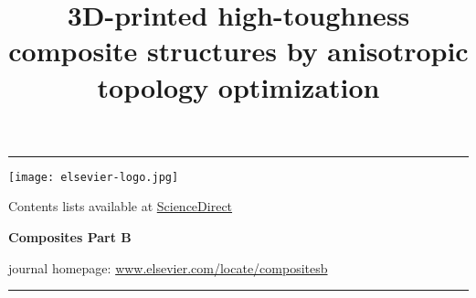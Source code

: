 \documentclass[a4paper,7pt,fleqn]{article}   %
\begin{document}
	\date{}
	
	\title{\vspace{70pt} \Large \raggedright \textbf{3D-printed high-toughness composite structures by anisotropic topology optimization}}
	
	\author{}
	\maketitle
	
	\vspace{-220pt}\noindent
	\begin{minipage}[t]{\textwidth}
		\begin{minipage}[t]{0.85\textwidth}
			\vspace{-\baselineskip} %
			\noindent \rule{\textwidth}{0.05em}
			\vspace{8pt}
			\begin{minipage}[t]{0.2\textwidth}
				\vspace{-\baselineskip} %
				\vspace{6pt}
				\texttt{[image: elsevier-logo.jpg]}
			\end{minipage}
			\hfill
			\begin{minipage}[t]{0.78\textwidth}
				\vspace{-\baselineskip} %
				\vspace{6pt}
				\begin{center}
					{Contents lists available at \href{www.sciencedirect.com/journal/composites-part-b-engineering}{ScienceDirect}} \par
					\vspace{15pt}				
					{\LARGE \bfseries Composites Part B} \par
					\vspace{15pt}				
					journal homepage: \href{www.elsevier.com/locate/compositesb}{www.elsevier.com/locate/compositesb}
				\end{center}
			\end{minipage}
		\end{minipage}
		\hfill
		\begin{minipage}[t]{0.14\textwidth}
			\vspace{-\baselineskip} %
		\end{minipage}
		\vspace{10pt}
		\noindent \rule{\textwidth}{0.36em}
	\end{minipage}
	
\end{document}

